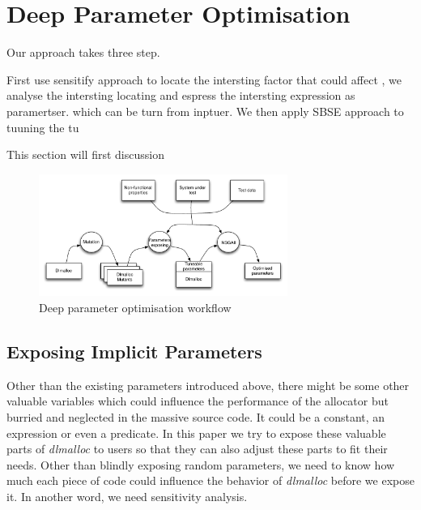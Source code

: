 \section{Deep Parameter Optimisation}

Our approach takes three step.

First use sensitify approach to locate the intersting factor that could affect , we analyse the intersting locating and espress the intersting expression as paramertser. which can be turn from inptuer. We then apply SBSE approach to tuuning the tu

This section will first discussion

\begin{figure}[htbp]
\centering
\includegraphics[width=3.2in]{pics/system}
\caption{Deep parameter optimisation workflow}\label{system}
\end{figure}


\subsection{Exposing Implicit Parameters}
Other than the existing parameters introduced above, there might be some other valuable variables which could influence the performance of the allocator but burried and neglected in the massive source code. It could be a constant, an expression or even a predicate. In this paper we try to expose these valuable parts of \emph{dlmalloc} to users so that they can also adjust these parts to fit their needs. Other than blindly exposing random parameters, we need to know how much each piece of code could influence the behavior of \emph{dlmalloc} before we expose it. In another word, we need sensitivity analysis.

